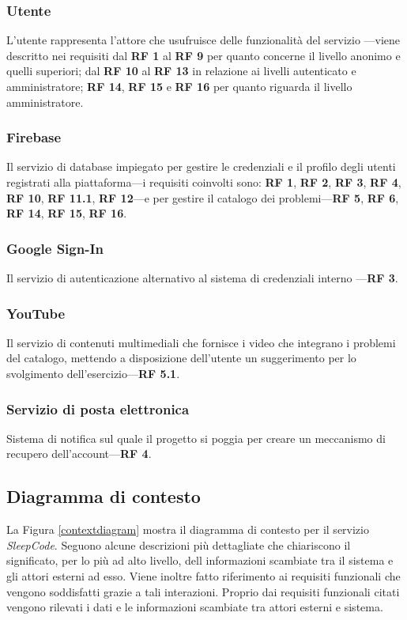 \documentclass[11pt, a4paper]{article}
\theoremstyle{definition} %
\begin{document}
\subsubsection{Utente}
L'utente rappresenta l'attore che usufruisce delle funzionalità del servizio
—viene descritto nei requisiti dal \textbf{RF 1} al \textbf{RF 9} per quanto
concerne il livello anonimo e quelli superiori; dal \textbf{RF 10} al
\textbf{RF 13} in relazione ai livelli autenticato e amministratore; \textbf{RF 14},
\textbf{RF 15} e \textbf{RF 16} per quanto riguarda il livello amministratore.

\subsubsection{Firebase}
Il servizio di database impiegato per gestire le credenziali e il profilo
degli utenti registrati alla piattaforma—i requisiti coinvolti sono: \textbf{RF 1},
\textbf{RF 2}, \textbf{RF 3}, \textbf{RF 4}, \textbf{RF 10}, \textbf{RF 11.1},
\textbf{RF 12}—e per gestire il catalogo dei problemi—\textbf{RF 5}, \textbf{RF 6},
\textbf{RF 14}, \textbf{RF 15}, \textbf{RF 16}.

\subsubsection{Google Sign-In}
Il servizio di autenticazione alternativo al sistema di credenziali interno
—\textbf{RF 3}.

\subsubsection{YouTube}
Il servizio di contenuti multimediali che fornisce i video che integrano
i problemi del catalogo, mettendo a disposizione dell'utente un suggerimento per lo
svolgimento dell'esercizio—\textbf{RF 5.1}.

\subsubsection{Servizio di posta elettronica}
Sistema di notifica sul quale il progetto si poggia per creare un
meccanismo di recupero dell'account—\textbf{RF 4}.

\newpage
\subsection{Diagramma di contesto} %
La Figura \ref{contextdiagram} mostra il diagramma di contesto per il
servizio \textit{SleepCode}. Seguono alcune descrizioni più dettagliate
che chiariscono il significato, per lo più ad alto livello, dell
informazioni scambiate tra il sistema e gli attori esterni ad esso.
Viene inoltre fatto riferimento ai requisiti funzionali che vengono
soddisfatti grazie a tali interazioni. Proprio dai requisiti funzionali
citati vengono rilevati i dati e le informazioni scambiate tra attori
esterni e sistema.
\end{document}
